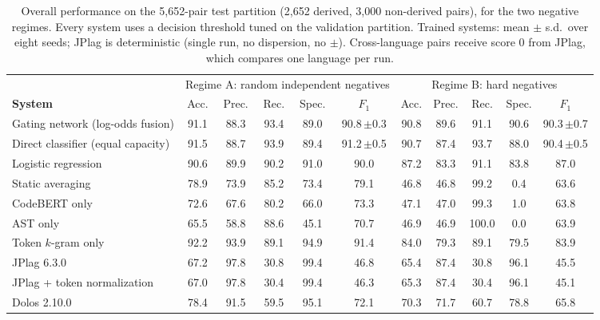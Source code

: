 \begin{table}[t]
\centering
\caption{Overall performance on the 5{,}652-pair test partition (2{,}652 derived, 3{,}000 non-derived pairs), for the two negative regimes. Every system uses a decision threshold tuned on the validation partition. Trained systems: mean $\pm$ s.d.\ over eight seeds; JPlag is deterministic (single run, no dispersion, no $\pm$). Cross-language pairs receive score 0 from JPlag, which compares one language per run.}
\label{tab:comparison-models}
\footnotesize
\begin{tabular}{l|ccccc|ccccc}
\toprule
 & \multicolumn{5}{c|}{Regime A: random independent negatives} & \multicolumn{5}{c}{Regime B: hard negatives} \\
\textbf{System} & Acc. & Prec. & Rec. & Spec. & $F_1$ & Acc. & Prec. & Rec. & Spec. & $F_1$ \\
\midrule
Gating network (log-odds fusion) & 91.1 & 88.3 & 93.4 & 89.0 & 90.8\,{\scriptsize$\pm$0.3} & 90.8 & 89.6 & 91.1 & 90.6 & 90.3\,{\scriptsize$\pm$0.7} \\
Direct classifier (equal capacity) & 91.5 & 88.7 & 93.9 & 89.4 & 91.2\,{\scriptsize$\pm$0.5} & 90.7 & 87.4 & 93.7 & 88.0 & 90.4\,{\scriptsize$\pm$0.5} \\
Logistic regression & 90.6 & 89.9 & 90.2 & 91.0 & 90.0 & 87.2 & 83.3 & 91.1 & 83.8 & 87.0 \\
Static averaging & 78.9 & 73.9 & 85.2 & 73.4 & 79.1 & 46.8 & 46.8 & 99.2 & 0.4 & 63.6 \\
CodeBERT only & 72.6 & 67.6 & 80.2 & 66.0 & 73.3 & 47.1 & 47.0 & 99.3 & 1.0 & 63.8 \\
AST only & 65.5 & 58.8 & 88.6 & 45.1 & 70.7 & 46.9 & 46.9 & 100.0 & 0.0 & 63.9 \\
Token $k$-gram only & 92.2 & 93.9 & 89.1 & 94.9 & 91.4 & 84.0 & 79.3 & 89.1 & 79.5 & 83.9 \\
JPlag 6.3.0 & 67.2 & 97.8 & 30.8 & 99.4 & 46.8 & 65.4 & 87.4 & 30.8 & 96.1 & 45.5 \\
JPlag + token normalization & 67.0 & 97.8 & 30.4 & 99.4 & 46.3 & 65.3 & 87.4 & 30.4 & 96.1 & 45.1 \\
Dolos 2.10.0 & 78.4 & 91.5 & 59.5 & 95.1 & 72.1 & 70.3 & 71.7 & 60.7 & 78.8 & 65.8 \\
\bottomrule
\end{tabular}
\end{table}